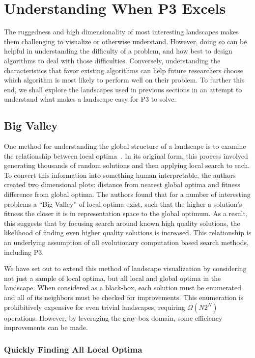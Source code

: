 \chapter{Understanding When P3 Excels}
The ruggedness and high dimensionality of most interesting landscapes makes them challenging
to visualize or otherwise understand. However, doing so can be helpful in
understanding the difficulty of a problem, and how best to design algorithms to deal
with those difficulties. Conversely, understanding the characteristics that favor
existing algorithms can help future researchers choose which algorithm is
most likely to perform well on their problem. To further this end, we shall
explore the landscapes used in previous sections in an attempt to understand
what makes a landscape easy for P3 to solve.


\section{Big Valley}
One method for understanding the global structure of a landscape
is to examine the relationship between local optima~\cite{boese:1994:bigvalley}.
In its original form, this process involved generating thousands of random solutions and then applying
local search to each. To convert this information into something human interpretable,
the authors created two dimensional plots: distance from nearest global optima and
fitness difference from global optima.
The authors found that for a number of interesting problems a ``Big Valley'' of
local optima exist, such that the higher a solution's fitness the closer it is
in representation space to the global optimum. As a result, this suggests that
by focusing search around known high quality solutions, the likelihood of finding even
higher quality solutions is increased. This relationship is an underlying assumption
of all evolutionary computation based search methods, including P3.

We have set out to extend this method of landscape visualization by considering not
just a sample of local optima, but all local and global optima in the landscape.
When considered as a black-box, each solution must be enumerated and all of its
neighbors must be checked for improvements. This enumeration is prohibitively expensive for
even trivial landscapes, requiring $\Omega(N2^N)$ operations.
However, by leveraging the gray-box domain, some efficiency improvements can be made.

\subsection{Quickly Finding All Local Optima}

